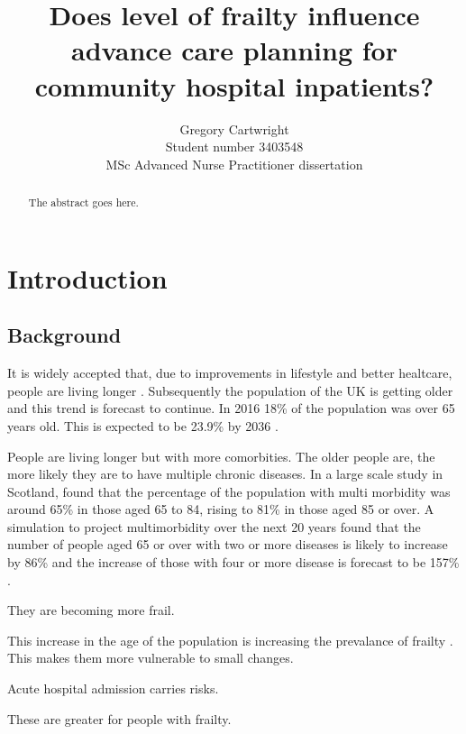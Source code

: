 \documentclass
[
	12pt,
	a4paper,
	oneside,
]{article}
\begin{document}
\author{Gregory Cartwright\\
	Student number 3403548\\
	MSc Advanced Nurse Practitioner dissertation
}
\title{Does level of frailty influence advance care planning 
	for community hospital inpatients?
}

\maketitle

\begin{abstract}
The abstract goes here.
\end{abstract}

\section{Introduction}

\subsection{Background}

It is widely accepted that, due to improvements in lifestyle and better healtcare, 
people are living longer \parencite{nao:08,ons:17}. Subsequently the population of 
the UK is getting older and this trend is forecast to continue.
In 2016 18\% of the population was over 65 years old. This is expected to be
23.9\% by 2036 \parencite{ons:17}.


People are living longer but with more comorbities. The older people are, the more
likely they are to have multiple chronic diseases. In a large scale study in
Scotland, \textcite{barnett:12} found that the percentage of the population with multi morbidity was around 
65\% in those aged 65 to 84, rising to 81\% in those aged 85 or over. A simulation 
to project multimorbidity over the next 20 years found that the number of people
aged 65 or over with two or more diseases is likely to increase by 86\% and the
increase of those with four or more disease is forecast to be 157\%
\parencite{kingston:18}.

They are becoming more frail.

This increase in the age of the population is increasing the prevalance of 
frailty \parencite{sharp:13}.
This makes them more vulnerable to small changes.

Acute hospital admission carries risks.

These are greater for people with frailty.
\end{document}
